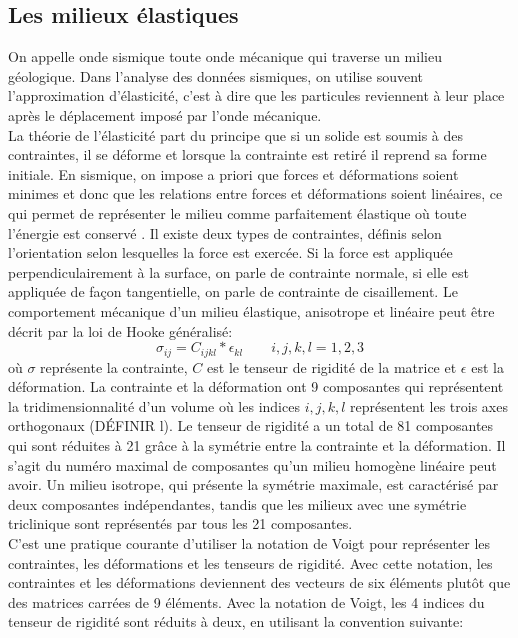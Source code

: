 \subsection{Les milieux élastiques}
 On appelle onde sismique toute onde mécanique qui traverse un milieu géologique. Dans l'analyse des données sismiques, on utilise souvent l'approximation d'élasticité, c'est à dire que les particules reviennent à leur place après le déplacement imposé par l'onde mécanique.\\
La théorie de l'élasticité part du principe que si un solide est soumis à des contraintes, il se déforme et lorsque la contrainte est retiré il reprend sa forme initiale. En sismique, on impose a priori que forces et déformations soient minimes et donc que les relations entre forces et déformations soient linéaires, ce qui permet de représenter le milieu comme parfaitement élastique où toute l'énergie est conservé \citep{Sheriff1995}. Il existe deux types de contraintes, définis selon l’orientation selon lesquelles la force est exercée. Si la force est appliquée perpendiculairement à la surface, on parle de contrainte normale, si elle est appliquée de façon tangentielle, on parle de contrainte de cisaillement. Le comportement mécanique d’un milieu élastique, anisotrope et linéaire peut être décrit par la loi de Hooke généralisé:
\begin{equation}
\sigma_{ij} = C_{ijkl}*\epsilon_{kl} \qquad i,j,k,l = 1,2,3
\label{eq:hooke}
\end{equation}
où $\sigma$ représente la contrainte, $C$ est le tenseur de rigidité de la matrice et $\epsilon$ est la déformation.
La contrainte et la déformation ont 9 composantes qui représentent la tridimensionnalité d’un volume où les indices $i, j, k, l$ représentent les trois axes orthogonaux (DÉFINIR l). Le tenseur de rigidité a un total de 81 composantes qui sont réduites à 21 grâce à la symétrie entre la contrainte et la déformation. Il s’agit du numéro maximal de composantes qu’un milieu homogène linéaire peut avoir. Un milieu isotrope, qui présente la symétrie maximale, est caractérisé par deux composantes indépendantes, tandis que les milieux avec une symétrie triclinique sont représentés par tous les 21 composantes.\\
C’est une pratique courante d’utiliser la notation de Voigt pour représenter les contraintes, les déformations et les tenseurs de rigidité. Avec cette notation, les contraintes et les déformations deviennent des vecteurs de six éléments plutôt que des matrices carrées de 9 éléments. Avec la notation de Voigt, les 4 indices du tenseur de rigidité sont réduits à deux, en utilisant la convention suivante:
